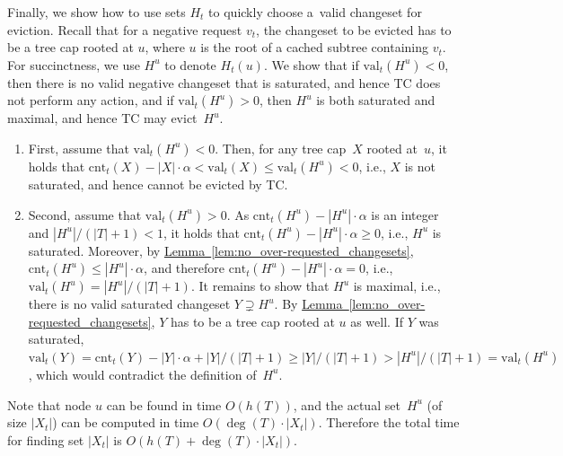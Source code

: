 \documentclass[sigconf,screen=true]{acmart}
\newcommand{\lref}[2][]{\hyperref[#2]{#1~\ref*{#2}}}
\newcommand{\ALG}{\textsc{TC}\xspace}
\newcommand{\cnt}{\textrm{cnt}}
\newcommand{\val}{\textrm{val}}
\begin{document}
Finally, we show how to use sets $H_t$ to quickly choose a~valid changeset for
eviction. Recall that for a negative request $v_t$, the changeset to be
evicted has to be a tree cap rooted at $u$, where $u$ is the root of a cached subtree
containing $v_t$. For succinctness, we use $H^u$ to denote $H_t(u)$. We show
that if $\val_t(H^u) < 0$, then there is no valid negative changeset that is
saturated, and hence \ALG does not perform any action, and if $\val_t(H^u) >
0$, then $H^u$ is both saturated and maximal, and hence \ALG may evict~$H^u$.

\begin{enumerate} 
\item First, assume that $\val_t(H^u) < 0$. Then, for any tree cap~$X$ rooted
at~$u$, it holds that $\cnt_t(X) - |X| \cdot \alpha < \val_t(X) \leq
\val_t(H^u) < 0$, i.e., $X$ is not saturated, and hence cannot be evicted by
\ALG.

\item Second, assume that $\val_t(H^u) > 0$. As $\cnt_t(H^u) - |H^u| \cdot
\alpha$ is an integer and $|H^u|/(|T|+1) < 1$, it holds that $\cnt_t(H^u) -
|H^u| \cdot \alpha \geq 0$, i.e., $H^u$ is saturated. Moreover, by
\lref[Lemma]{lem:no_over-requested_changesets}, $\cnt_t(H^u) \leq |H^u| \cdot
\alpha$, and therefore $\cnt_t(H^u) - |H^u| \cdot \alpha = 0$, i.e.,
$\val_t(H^u) = |H^u| / (|T|+1)$. It remains to show that $H^u$ is maximal,
i.e., there is no valid saturated changeset $Y \supsetneq H^u$. By
\lref[Lemma]{lem:no_over-requested_changesets}, $Y$ has to be a tree cap
rooted at $u$ as well. If $Y$ was saturated, $\val_t(Y) = \cnt_t(Y) - |Y|
\cdot \alpha + |Y| / (|T|+1) \geq |Y| / (|T|+1) > |H^u|/(|T|+1) = \val_t(H^u)$, 
which would contradict the definition of~$H^u$.
\end{enumerate}

Note that node $u$ can be found in time $O(h(T))$, and the 
actual set~$H^u$ (of size $|X_t|$) can be computed 
in time $O(\deg(T) \cdot |X_t|)$. Therefore the total time 
for finding set $|X_t|$ is $O(h(T) + \deg(T) \cdot |X_t|)$.


%
\end{document}
